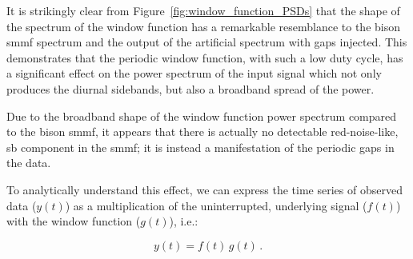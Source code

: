 
It is strikingly clear from Figure~\ref{fig:window_function_PSDs} that the shape of the spectrum of the window function has a remarkable resemblance to the \gls{bison} \gls{smmf} spectrum and the output of the artificial spectrum with gaps injected. This demonstrates that the periodic window function, with such a low duty cycle, has a significant effect on the power spectrum of the input signal which not only produces the diurnal sidebands, but also a broadband spread of the power.

Due to the broadband shape of the window function power spectrum compared to the \gls{bison} \gls{smmf}, it appears that there is actually no detectable red-noise-like, \gls{sb} component in the \gls{smmf}; it is instead a manifestation of the periodic gaps in the data. %

To analytically understand this effect, we can express the time series of observed data ($y(t)$) as a multiplication of the uninterrupted, underlying signal ($f(t)$) with the window function ($g(t)$), i.e.:

\begin{equation}
y(t)  = f(t) \, g(t)
\label{eq:timeseries} \, .
\end{equation}

